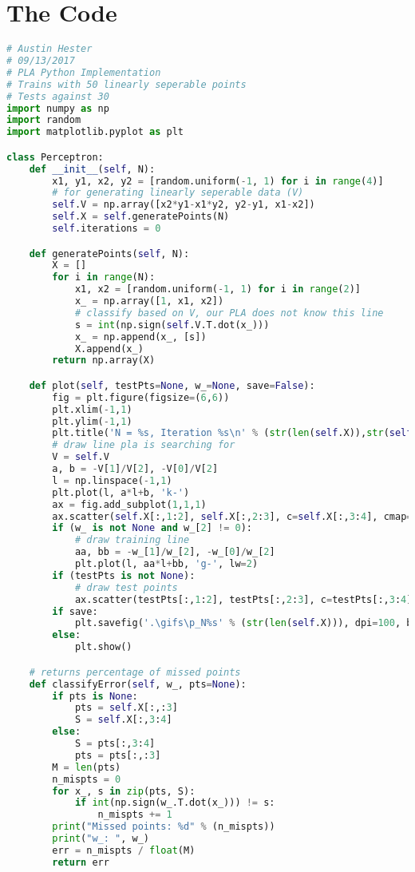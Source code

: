 \documentclass{article}
\begin{document}
\newpage
\section*{The Code}
\lstset{
	frame=tb,
	tabsize=4,
	showstringspaces=false
}
\begin{lstlisting}[language=Python,breaklines=true,basicstyle=\small]
# Austin Hester
# 09/13/2017
# PLA Python Implementation
# Trains with 50 linearly seperable points
# Tests against 30
import numpy as np
import random
import matplotlib.pyplot as plt

class Perceptron:
    def __init__(self, N):
        x1, y1, x2, y2 = [random.uniform(-1, 1) for i in range(4)]
        # for generating linearly seperable data (V)
        self.V = np.array([x2*y1-x1*y2, y2-y1, x1-x2])
        self.X = self.generatePoints(N)
        self.iterations = 0

    def generatePoints(self, N):
        X = []
        for i in range(N):
            x1, x2 = [random.uniform(-1, 1) for i in range(2)]
            x_ = np.array([1, x1, x2])
            # classify based on V, our PLA does not know this line
            s = int(np.sign(self.V.T.dot(x_)))
            x_ = np.append(x_, [s])
            X.append(x_)
        return np.array(X)

    def plot(self, testPts=None, w_=None, save=False):
        fig = plt.figure(figsize=(6,6))
        plt.xlim(-1,1)
        plt.ylim(-1,1)
        plt.title('N = %s, Iteration %s\n' % (str(len(self.X)),str(self.iterations)))
        # draw line pla is searching for
        V = self.V
        a, b = -V[1]/V[2], -V[0]/V[2]
        l = np.linspace(-1,1)
        plt.plot(l, a*l+b, 'k-')
        ax = fig.add_subplot(1,1,1)
        ax.scatter(self.X[:,1:2], self.X[:,2:3], c=self.X[:,3:4], cmap='prism')
        if (w_ is not None and w_[2] != 0):
            # draw training line
            aa, bb = -w_[1]/w_[2], -w_[0]/w_[2]
            plt.plot(l, aa*l+bb, 'g-', lw=2)
        if (testPts is not None):
            # draw test points
            ax.scatter(testPts[:,1:2], testPts[:,2:3], c=testPts[:,3:4], cmap='cool')
        if save:
            plt.savefig('.\gifs\p_N%s' % (str(len(self.X))), dpi=100, bbox_inches='tight')
        else:
            plt.show()

    # returns percentage of missed points
    def classifyError(self, w_, pts=None):
        if pts is None:
            pts = self.X[:,:3]
            S = self.X[:,3:4]
        else:
            S = pts[:,3:4]
            pts = pts[:,:3]
        M = len(pts)
        n_mispts = 0
        for x_, s in zip(pts, S):
            if int(np.sign(w_.T.dot(x_))) != s:
                n_mispts += 1
        print("Missed points: %d" % (n_mispts))
        print("w_: ", w_)
        err = n_mispts / float(M)
        return err


\end{lstlisting}
\end{document}
